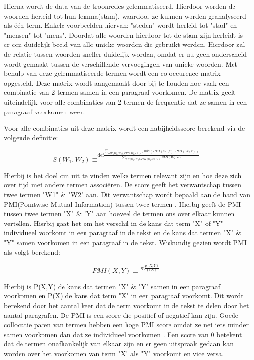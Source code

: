 Hierna wordt de data van de troonredes gelemmatiseerd. Hierdoor worden de woorden herleid tot hun lemma(stam), waardoor ze kunnen worden geanalyseerd als één term. Enkele voorbeelden hiervan: "steden" wordt herleid tot "stad" en "mensen" tot "mens". Doordat alle woorden hierdoor tot de stam zijn herleidt is er een duidelijk beeld van alle unieke woorden die gebruikt worden. Hierdoor zal de relatie tussen woorden sneller duidelijk worden, omdat er nu geen onderscheid wordt gemaakt tussen de verschillende vervoegingen van unieke woorden. Met behulp van deze gelemmatiseerde termen wordt een co-occurence matrix opgesteld. Deze matrix wordt aangemaakt door bij te houden hoe vaak een combinatie van 2 termen samen in een paragraaf voorkomen. De matrix geeft uiteindelijk voor alle combinaties van 2 termen de frequentie dat ze samen in een paragraaf voorkomen weer.

Voor alle combinaties uit deze matrix wordt een nabijheidsscore berekend via de volgende definitie: 

 $$S(W_1,W_2)\equiv^{\mathrm{def}\frac{\sum_{c\epsilon W\setminus{W_1,W_2\},PMI(W_1,c)>0}}min(PMI(W_1,c),PMI(W_2,c))}{\sum_{c\epsilon W\{W_1,W_2\},PMI(W_1,c)>0}PMI(W_1,c)}}$$ 



Hierbij is het doel om uit te vinden welke termen relevant zijn en hoe deze zich over tijd met andere termen associëren. De score geeft het verwantschap tussen twee termen "W1" \& "W2" aan. Dit verwantschap wordt bepaald aan de hand van PMI(Pointwise Mutual Information) tussen twee termen \citep{bouma2009normalized}. Hierbij geeft de PMI tussen twee termen "X" \& "Y" aan hoeveel de termen ons over elkaar kunnen vertellen. Hierbij gaat het om het verschil in de kans dat term "X" of "Y" individueel voorkomt in een paragraaf in de tekst en de kans dat termen "X" \& "Y" samen voorkomen in een paragraaf in de tekst. Wiskundig gezien wordt PMI als volgt berekend: 

$$PMI(X,Y)\equiv^{\mathrm{log}\frac{p(X,Y)}{p(X)}}$$

Hierbij is P(X,Y) de kans dat termen "X" \& "Y" samen in een paragraaf voorkomen en P(X) de kans dat term "X" in een paragraaf voorkomt. Dit wordt berekend door het aantal keer dat de term voorkomt in de tekst te delen door het aantal paragrafen. De PMI is een score die positief of negatief kan zijn. Goede collocatie paren van termen hebben een hoge PMI score omdat ze net iets minder samen voorkomen dan dat ze individueel voorkomen .  Een score van 0 betekent dat de termen onafhankelijk van elkaar zijn en er geen uitspraak gedaan kan worden over het voorkomen van term "X" als "Y" voorkomt en vice versa.


